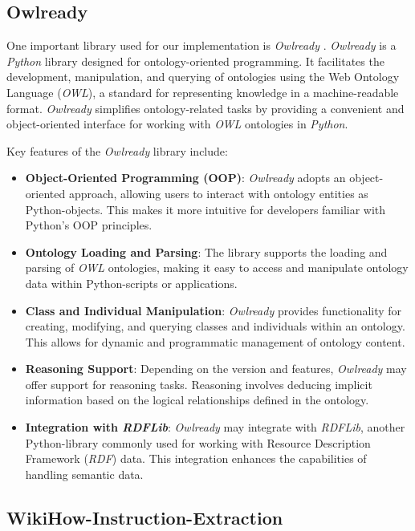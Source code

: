 	\subsection{Owlready}
	\label{sec:OWLReady}
	One important library used for our implementation is \textit{Owlready} \cite{LAMY201711}. \textit{Owlready} is a \textit{Python} library designed for ontology-oriented programming. It facilitates the development, manipulation, and querying of ontologies using the Web Ontology Language (\textit{OWL}), a standard for representing knowledge in a machine-readable format. \textit{Owlready} simplifies ontology-related tasks by providing a convenient and object-oriented interface for working with \textit{OWL} ontologies in \textit{Python}.

	Key features of the \textit{Owlready} library include:

	\begin{itemize}
		\item \textbf{Object-Oriented Programming (OOP)}: \textit{Owlready} adopts an object-oriented approach, allowing users to interact with ontology entities as Python-objects. This makes it more intuitive for developers familiar with Python's OOP principles.
		\item \textbf{Ontology Loading and Parsing}: The library supports the loading and parsing of \textit{OWL} ontologies, making it easy to access and manipulate ontology data within Python-scripts or applications.
		\item \textbf{Class and Individual Manipulation}: \textit{Owlready} provides functionality for creating, modifying, and querying classes and individuals within an ontology. This allows for dynamic and programmatic management of ontology content.
		\item \textbf{Reasoning Support}: Depending on the version and features, \textit{Owlready} may offer support for reasoning tasks. Reasoning involves deducing implicit information based on the logical relationships defined in the ontology.
		\item \textbf{Integration with \textit{RDFLib}}: \textit{Owlready} may integrate with \textit{RDFLib}, another Python-library commonly used for working with Resource Description Framework (\textit{RDF}) data. This integration enhances the capabilities of handling semantic data.
	\end{itemize}

	\subsection{WikiHow-Instruction-Extraction}
	\label{sec:WikiHow}
	
